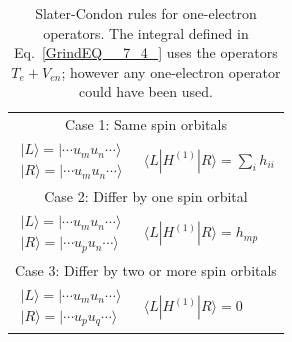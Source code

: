 \documentclass[11pt,oneside,final]{huthesis}%
\begin{document}
\begin{table}
\begin{center}
\begin{tabular}{ll} \hline 
\multicolumn{2}{c}{Case 1: Same spin orbitals }\\[1.5ex]
$\begin{array}{c}
|L\rangle =|\cdots u_{m} u_{n} \cdots \rangle \\
|R\rangle =|\cdots u_{m} u_{n} \cdots \rangle  
\end{array}$ &
 $\langle L|H^{(1)} |R\rangle =\sum _{i}h_{ii}  $  \\[5ex]
\multicolumn{2}{c}{Case 2: Differ by one spin orbital }  \\[1.5ex]
$\begin{array}{c}
|L\rangle =|\cdots u_{m} u_{n} \cdots \rangle \\ 
|R\rangle =|\cdots u_{p} u_{n} \cdots \rangle 
\end{array}$
& $\langle L|H^{(1)} |R\rangle =h_{mp} $ \\[5ex] 
\multicolumn{2}{c}{Case 3: Differ by two or more spin orbitals} \\[1.5ex]
$\begin{array}{c}
|L\rangle =|\cdots u_{m} u_{n} \cdots \rangle\\
|R\rangle =|\cdots u_{p} u_{q} \cdots \rangle 
\end{array}$
& $\langle L|H^{(1)} |R\rangle =0$  \\[2ex]\hline  
\end{tabular}
\end{center}
\caption{Slater-Condon rules for one-electron operators. The integral defined in Eq.~\eqref{GrindEQ__7_4_} uses the operators $T_{e}+V_{en}$; however any one-electron operator could have been used. }\label{tbl:sc1}
\end{table}
\end{document}
